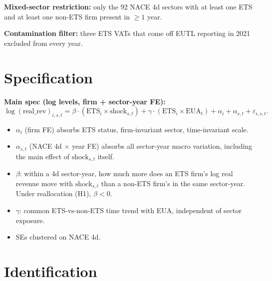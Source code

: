 \documentclass[11pt]{article}
\begin{document}
\textbf{Mixed-sector restriction:} only the 92 NACE 4d sectors with at least one ETS and at least one non-ETS firm present in $\geq 1$ year.

\textbf{Contamination filter:} three ETS VATs that come off EUTL reporting in 2021 excluded from every year.

\section{Specification}

\textbf{Main spec (log levels, firm + sector-year FE):}
\begin{equation}
  \log(\mathrm{real\_rev})_{i,s,t} = \beta \cdot (\mathrm{ETS}_i \times \mathrm{shock}_{s,t}) + \gamma \cdot (\mathrm{ETS}_i \times \mathrm{EUA}_t) + \alpha_i + \alpha_{s,t} + \varepsilon_{i,s,t}.
\end{equation}
\begin{itemize}
  \item $\alpha_i$ (firm FE) absorbs ETS status, firm-invariant sector, time-invariant scale.
  \item $\alpha_{s,t}$ (NACE 4d $\times$ year FE) absorbs all sector-year macro variation, including the main effect of $\mathrm{shock}_{s,t}$ itself.
  \item $\beta$: within a 4d sector-year, how much more does an ETS firm's log real revenue move with $\mathrm{shock}_{s,t}$ than a non-ETS firm's in the same sector-year. Under reallocation (H1), $\beta < 0$.
  \item $\gamma$: common ETS-vs-non-ETS time trend with EUA, independent of sector exposure.
  \item SEs clustered on NACE 4d.
\end{itemize}

\section{Identification}
\end{document}
